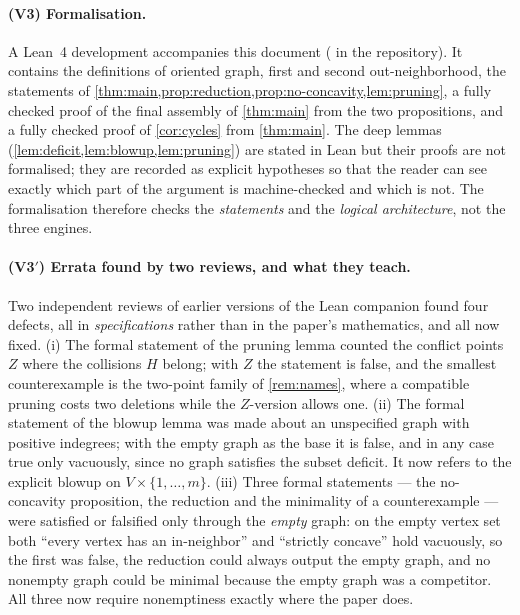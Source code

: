 \paragraph{(V3) Formalisation.} A Lean~4 development accompanies this document ( in the
repository). It contains the definitions of oriented graph, first and second out-neighborhood, the
statements of \cref{thm:main,prop:reduction,prop:no-concavity,lem:pruning}, a fully checked proof of
the final assembly of \cref{thm:main} from the two propositions, and a fully checked proof of
\cref{cor:cycles} from \cref{thm:main}. The deep lemmas (\cref{lem:deficit,lem:blowup,lem:pruning})
are stated in Lean but their proofs are not formalised; they are recorded as explicit hypotheses so
that the reader can see exactly which part of the argument is machine-checked and which is not. The
formalisation therefore checks the \emph{statements} and the \emph{logical architecture}, not the
three engines.

\paragraph{(V3$'$) Errata found by two reviews, and what they teach.} Two independent reviews of earlier
versions of the Lean companion found four defects, all in \emph{specifications} rather than in the
paper's mathematics, and all now fixed. (i) The formal statement of the pruning lemma counted the
conflict points $Z$ where the collisions $H$ belong; with $Z$ the statement is false, and the smallest
counterexample is the two-point family of \cref{rem:names}, where a compatible pruning costs two
deletions while the $Z$-version allows one. (ii) The formal statement of the blowup lemma was made
about an unspecified graph with positive indegrees; with the empty graph as the base it is false, and
in any case true only vacuously, since no graph satisfies the subset deficit. It now refers to the
explicit blowup on $V\times\{1,\dots,m\}$. (iii) Three formal statements --- the no-concavity
proposition, the reduction and the minimality of a counterexample --- were satisfied or falsified only
through the \emph{empty} graph: on the empty vertex set both ``every vertex has an in-neighbor'' and
``strictly concave'' hold vacuously, so the first was false, the reduction could always output the
empty graph, and no nonempty graph could be minimal because the empty graph was a competitor. All
three now require nonemptiness exactly where the paper does.

